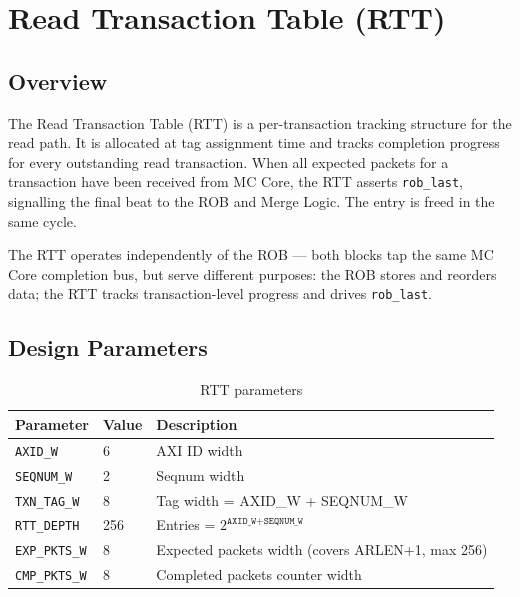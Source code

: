 \section{Read Transaction Table (RTT)}
\subsection{Overview}

The Read Transaction Table (RTT) is a per-transaction tracking structure
for the read path. It is allocated at tag assignment time and tracks
completion progress for every outstanding read transaction. When all
expected packets for a transaction have been received from MC Core,
the RTT asserts \texttt{rob\_last}, signalling the final beat to the
ROB and Merge Logic. The entry is freed in the same cycle.

The RTT operates independently of the ROB — both blocks tap the same
MC Core completion bus, but serve different purposes: the ROB stores
and reorders data; the RTT tracks transaction-level progress and drives
\texttt{rob\_last}.

\subsection{Design Parameters}

\begin{table}[h!]
\centering
\begin{tabular}{lll}
\toprule
\textbf{Parameter} & \textbf{Value} & \textbf{Description} \\
\midrule
\texttt{AXID\_W}         & 6   & AXI ID width \\
\texttt{SEQNUM\_W}       & 2   & Seqnum width \\
\texttt{TXN\_TAG\_W}     & 8   & Tag width = AXID\_W + SEQNUM\_W \\
\texttt{RTT\_DEPTH}      & 256 & Entries = $2^{\texttt{AXID\_W} + \texttt{SEQNUM\_W}}$ \\
\texttt{EXP\_PKTS\_W}    & 8   & Expected packets width (covers ARLEN+1, max 256) \\
\texttt{CMP\_PKTS\_W}    & 8   & Completed packets counter width \\
\bottomrule
\end{tabular}
\caption{RTT parameters}
\end{table}


